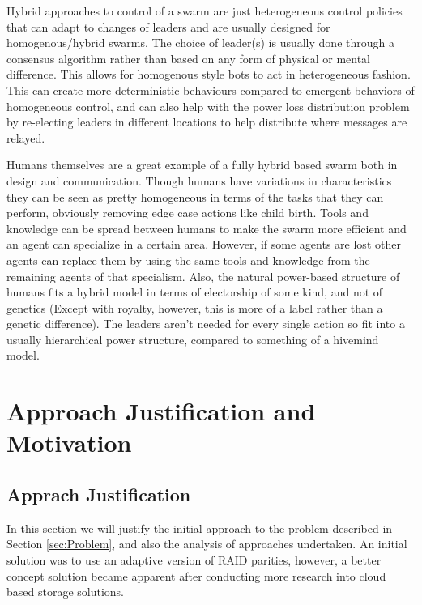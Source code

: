 \documentclass{UoYCSproject}
\begin{document}
Hybrid approaches to control of a swarm are just heterogeneous control policies that can adapt to changes of leaders and are usually designed for homogenous/hybrid swarms. 
The choice of leader(s) is usually done through a consensus algorithm \cite{Paxos} rather than based on any form of physical or mental difference. 
This allows for homogenous style bots to act in heterogeneous fashion. 
This can create more deterministic behaviours compared to emergent behaviors of homogeneous control, and can also help with the power loss distribution problem by re-electing leaders in different locations to help distribute where messages are relayed.

Humans themselves are a great example of a fully hybrid based swarm both in design and communication. 
Though humans have variations in characteristics they can be seen as pretty homogeneous in terms of the tasks that they can perform, obviously removing edge case actions like child birth. 
Tools and knowledge can be spread between humans to make the swarm more efficient and an agent can specialize in a certain area. 
However, if some agents are lost other agents can replace them by using the same tools and knowledge from the remaining agents of that specialism. 
Also, the natural power-based structure of humans fits a hybrid model in terms of electorship of some kind, and not of genetics (Except with royalty, however, this is more of a label rather than a genetic difference). 
The leaders aren't needed for every single action so fit into a usually hierarchical power structure, compared to something of a hivemind model.


\chapter{Approach Justification and Motivation}
\label{cha:Approach and Motivation}

\section{Apprach Justification}
\label{sec:Inital Soloution Ideas}

In this section we will justify the initial approach to the problem described in Section \ref{sec:Problem}, and also the analysis of approaches undertaken. An initial solution was to use an adaptive version of RAID parities, however, a better concept solution became apparent after conducting more research into cloud based storage solutions.
\end{document}
